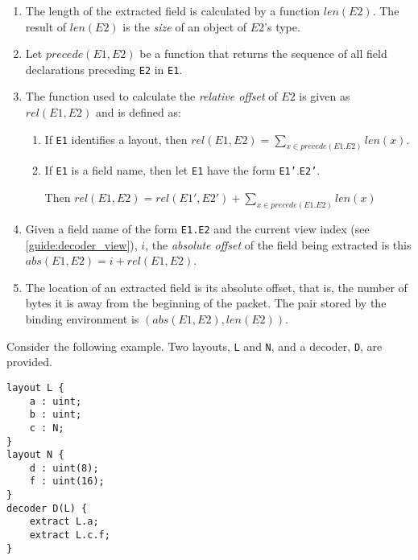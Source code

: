 \begin{enumerate}
\item The length of the extracted field is calculated by a function $len(E2)$. The result of $len(E2)$ is the \textit{size} of an object of $E2$'s type.

\item  Let $precede(E1, E2)$ be a function that returns the sequence of all field declarations preceding \texttt{E2} in \texttt{E1}. 

\item The function used to calculate the \textit{relative offset} of $E2$ is given as $rel(E1, E2)$ and is defined as:

\begin{enumerate}

\item If \texttt{E1} identifies a layout, then $rel(E1, E2) = \sum_{x \in precede(E1.E2)}{} len(x)$.

\item If \texttt{E1} is a field name, then let \texttt{E1} have the form \texttt{E1'}.\texttt{E2'}.

Then $rel(E1, E2)=rel(E1', E2') + \sum_{x \in precede(E1.E2)}{} len(x)$

\end{enumerate}

\item Given a field name of the form \texttt{E1.E2} and the current view index (see \ref{guide:decoder_view}), $i$, the \textit{absolute offset} of the field being extracted is this $abs(E1, E2) = i + rel(E1, E2)$.

\item The location of an extracted field is its absolute offset, that is, the number of bytes it is away from the beginning of the packet. The pair stored by the binding environment is $(abs(E1, E2), len(E2))$.

\end{enumerate}

Consider the following example. Two layouts, \texttt{L} and \texttt{N}, and a decoder, \texttt{D}, are provided.

\begin{minip}
\begin{lstlisting}
layout L {
	a : uint;
	b : uint;
	c : N;
}
layout N {
	d : uint(8);
	f : uint(16);
}
decoder D(L) {
	extract L.a;
	extract L.c.f;
}
\end{lstlisting}
\end{minip}

